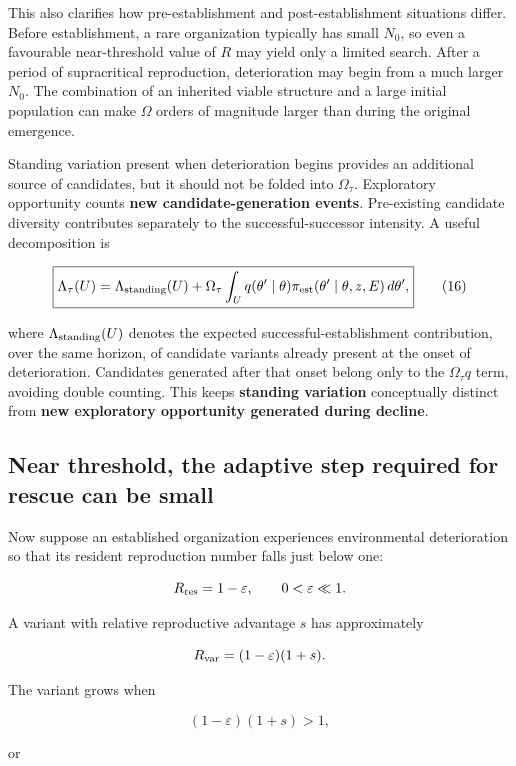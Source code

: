 \documentclass[11pt,a4paper]{article}
\begin{document}
This also clarifies how pre-establishment and post-establishment
situations differ. Before establishment, a rare organization typically
has small \(N_0\), so even a favourable near-threshold value of \(R\)
may yield only a limited search. After a period of supracritical
reproduction, deterioration may begin from a much larger \(N_0\). The
combination of an inherited viable structure and a large initial
population can make \(\Omega\) orders of magnitude larger than during
the original emergence.

Standing variation present when deterioration begins provides an
additional source of candidates, but it should not be folded into
\(\Omega_\tau\). Exploratory opportunity counts \textbf{new
candidate-generation events}. Pre-existing candidate diversity
contributes separately to the successful-successor intensity. A useful
decomposition is

\[
\boxed{
\Lambda_\tau(U)
=
\Lambda_{\rm standing}(U)
+
\Omega_\tau
\int_U
q(\theta'\mid\theta)
\pi_{\rm est}(\theta'\mid\theta,z,E)
\,d\theta',
}
\tag{16}
\]

where \(\Lambda_{\rm standing}(U)\) denotes the expected
successful-establishment contribution, over the same horizon, of
candidate variants already present at the onset of deterioration.
Candidates generated after that onset belong only to the
\(\Omega_\tau q\) term, avoiding double counting. This keeps
\textbf{standing variation} conceptually distinct from \textbf{new
exploratory opportunity generated during decline}.

\subsection{Near threshold, the adaptive step required for rescue can be
small}\label{near-threshold-the-adaptive-step-required-for-rescue-can-be-small}

Now suppose an established organization experiences environmental
deterioration so that its resident reproduction number falls just below
one:

\[
R_{\rm res}=1-\varepsilon,
\qquad
0<\varepsilon\ll1.
\]

A variant with relative reproductive advantage \(s\) has approximately

\[
R_{\rm var}
=
(1-\varepsilon)(1+s).
\]

The variant grows when

\[
(1-\varepsilon)(1+s)>1,
\]

or
\end{document}
